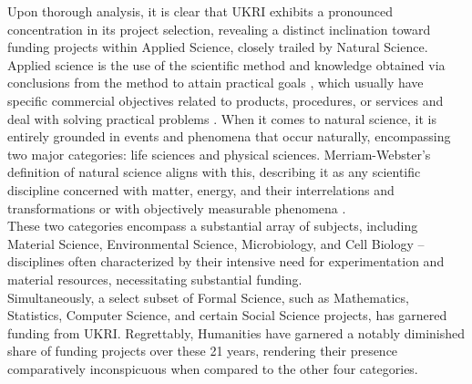 Upon thorough analysis, it is clear that UKRI exhibits a pronounced concentration in its project selection, revealing a distinct inclination toward funding projects within Applied Science, closely trailed by Natural Science. Applied science is the use of the scientific method and knowledge obtained via conclusions from the method to attain practical goals \citep{bunge1966technology}, which usually have specific commercial objectives related to products, procedures, or services and deal with solving practical problems \citep{potter2015crime}. When it comes to natural science, it is entirely grounded in events and phenomena that occur naturally, encompassing two major categories: life sciences and physical sciences. Merriam-Webster's definition of natural science aligns with this, describing it as any scientific discipline concerned with matter, energy, and their interrelations and transformations or with objectively measurable phenomena \citep{ledoux2002defining}.\\

These two categories encompass a substantial array of subjects, including Material Science, Environmental Science, Microbiology, and Cell Biology – disciplines often characterized by their intensive need for experimentation and material resources, necessitating substantial funding. \\

Simultaneously, a select subset of Formal Science, such as Mathematics, Statistics, Computer Science, and certain Social Science projects, has garnered funding from UKRI. Regrettably, Humanities have garnered a notably diminished share of funding projects over these 21 years, rendering their presence comparatively inconspicuous when compared to the other four categories.\\


